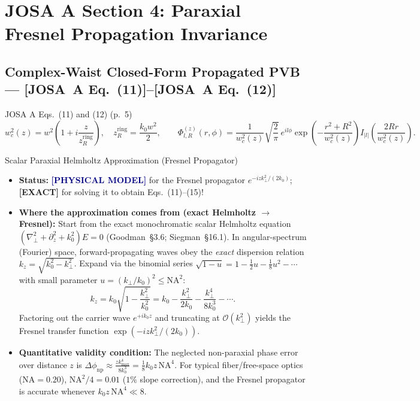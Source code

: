 \documentclass[10pt,letterpaper]{article}
\newcommand{\abs}[1]{\lvert #1 \rvert}
\newcommand{\josa}[1]{\textbf{[JOSA~A Eq.~(#1)]}}
\newcommand{\tagexact}{\textcolor{forest}{\textbf{[EXACT]}}}
\newcommand{\tagmodel}{\textcolor{navy}{\textbf{[PHYSICAL MODEL]}}}
\numberwithin{equation}{section}
\begin{document}
\section{JOSA A Section 4: Paraxial Fresnel Propagation Invariance}
\label{sec:v2_s4}

\subsection{Complex-Waist Closed-Form Propagated PVB --- \josa{11}--\josa{12}}

\begin{targeteq}{JOSA A Eqs.~(11) and (12) (p.~5)}
\[
  w_c^2(z) = w^2\!\left(1 + i\frac{z}{z_R^{\mathrm{ring}}}\right), \quad z_R^{\mathrm{ring}} = \frac{k_0 w^2}{2}, \qquad
  \Phi_{l,R}^{(z)}(r,\phi) = \frac{1}{w_c^2(z)}\sqrt{\frac{2}{\pi}}\,e^{il\phi}\exp\!\left(-\frac{r^2+R^2}{w_c^2(z)}\right) I_{\abs{l}}\!\left(\frac{2Rr}{w_c^2(z)}\right).
\]
\end{targeteq}

\begin{approxbox}{Scalar Paraxial Helmholtz Approximation (Fresnel Propagator)}
\begin{itemize}[leftmargin=1.4em,itemsep=2pt,topsep=1pt]
  \item \textbf{Status:} \tagmodel{} for the Fresnel propagator $e^{-iz k_\perp^2/(2k_0)}$; \tagexact{} for solving it to obtain Eqs.~(11)--(15)!
  \item \textbf{Where the approximation comes from (exact Helmholtz $\to$ Fresnel):} Start from the exact monochromatic scalar Helmholtz equation $(\nabla_\perp^2 + \partial_z^2 + k_0^2) E = 0$ (Goodman~\S3.6; Siegman~\S16.1). In angular-spectrum (Fourier) space, forward-propagating waves obey the \emph{exact} dispersion relation $k_z = \sqrt{k_0^2 - k_\perp^2}$. Expand via the binomial series $\sqrt{1 - u} = 1 - \frac{1}{2}u - \frac{1}{8}u^2 - \cdots$ with small parameter $u = (k_\perp/k_0)^2 \le \mathrm{NA}^2$:
  \[
    k_z = k_0\sqrt{1 - \frac{k_\perp^2}{k_0^2}} = k_0 - \frac{k_\perp^2}{2k_0} - \frac{k_\perp^4}{8k_0^3} - \cdots.
  \]
  Factoring out the carrier wave $e^{+ik_0 z}$ and truncating at $\mathcal{O}(k_\perp^2)$ yields the Fresnel transfer function $\exp(-iz k_\perp^2/(2k_0))$.
  \item \textbf{Quantitative validity condition:} The neglected non-paraxial phase error over distance $z$ is $\Delta\phi_{\mathrm{np}} \approx \frac{z k_{\max}^4}{8 k_0^3} = \frac{1}{8} k_0 z\,\mathrm{NA}^4$. For typical fiber/free-space optics ($\mathrm{NA} = 0.20$), $\mathrm{NA}^2/4 = 0.01$ ($1\%$ slope correction), and the Fresnel propagator is accurate whenever $k_0 z\,\mathrm{NA}^4 \ll 8$.
\end{itemize}
\end{approxbox}
\end{document}
